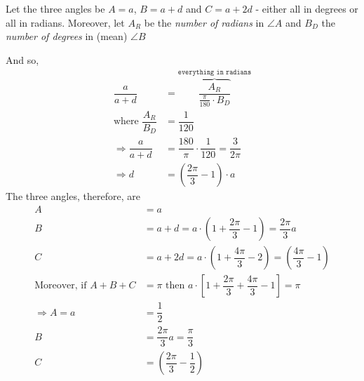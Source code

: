 \begin{solution}
  \begin{fullwidth}
   Let the three angles be $A=a$, $B=a+d$ and $C=a+2d$ - either all in degrees or all in radians. 
   Moreover, let $A_R$ be the \textit{number of radians} in $\angle A$ and $B_D$ the
   \textit{number of degrees} in (mean) $\angle B$
   
   And so, 
   \begin{align}
       \dfrac{a}{a+d} &= \overbrace{\dfrac{A_R}{\frac{\pi}{180}\cdot B_D}}^{\texttt{everything in radians}} \\
       \text{where } \dfrac{A_R}{B_D} &= \dfrac{1}{120} \\
       \Rightarrow \dfrac{a}{a+d} &= \dfrac{180}{\pi}\cdot\dfrac{1}{120} = \dfrac{3}{2\pi} \\
       \Rightarrow d &= \left( \dfrac{2\pi}{3}-1\right)\cdot a 
   \end{align}
   The three angles, therefore, are 
   \begin{align}
      A &= a \\
      B &= a + d = a\cdot\left(1 + \dfrac{2\pi}{3} - 1 \right) = \dfrac{2\pi}{3}a\\
      C &= a + 2d = a\cdot\left( 1 + \dfrac{4\pi}{3} - 2\right) = \left( \dfrac{4\pi}{3} - 1\right) \\
      \text{Moreover, if } A + B + C &= \pi \text{ then } 
      a\cdot\left[1 + \dfrac{2\pi}{3} + \dfrac{4\pi}{3} - 1 \right] = \pi \\
      \Rightarrow A = a &= \dfrac{1}{2} \\
      B &= \dfrac{2\pi}{3}a = \dfrac{\pi}{3} \\
      C &= \left(\dfrac{2\pi}{3} - \dfrac{1}{2} \right)
   \end{align}
 \end{fullwidth}
\end{solution}
